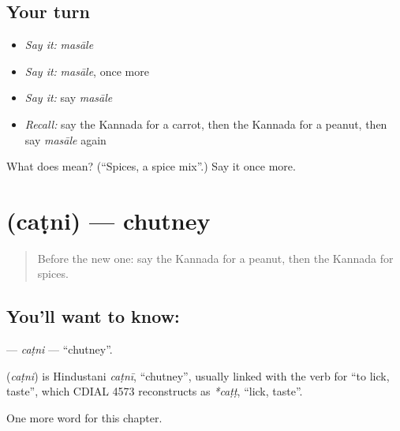 \subsection*{Your turn}
\begin{itemize}
\raggedright
  \item \emph{Say it:} \emph{masāle}
  \item \emph{Say it:} \emph{masāle}, once more
  \item \emph{Say it:} say \emph{masāle}
  \item \emph{Recall:} say the Kannada for a carrot, then the Kannada for a peanut, then say \emph{masāle} again
\end{itemize}

\begin{tcolorbox}[breakable,colback=teal!4,colframe=teal!35!black,title={Before you move on}]
What does  mean? (\textquotedblleft{}Spices, a spice mix\textquotedblright{}.) Say it once more.
\end{tcolorbox}
\section[\texorpdfstring{\kn{ಚಟ್ನಿ} (caṭni)}{ಚಟ್ನಿ (caṭni)}]{ (caṭni) — chutney}

\label{lesson:KA-C294-catni}



\begin{quote}
Before the new one: say the Kannada for a peanut, then the Kannada for spices.
\end{quote}

\subsection*{You'll want to know: }
\textbf{} — \emph{caṭni} — \textquotedblleft{}chutney\textquotedblright{}.

\begin{cousinweb}
\textbf{} (\emph{caṭni}) is Hindustani \emph{caṭnī}, \textquotedblleft{}chutney\textquotedblright{}, usually linked with the verb for \textquotedblleft{}to lick, taste\textquotedblright{}, which CDIAL 4573 reconstructs as \emph{*caṭṭ}, \textquotedblleft{}lick, taste\textquotedblright{}.
\end{cousinweb}

\begin{grammarlens}[title={What you've built}]
One more word for this chapter.
\end{grammarlens}


